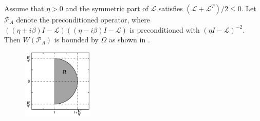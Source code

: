\documentclass[review]{siamart}
\begin{document}
%
\begin{theorem}\label{th:fov}
Assume that $\eta > 0$ and the symmetric part of $\mathcal{L}$ satisfies
$(\mathcal{L}+\mathcal{L}^T)/2 \leq 0$. Let $\mathcal{P}_A$ denote the preconditioned
operator, where $((\eta + i\beta)I - \mathcal{L})((\eta - i\beta)I - \mathcal{L})$ is
preconditioned with $(\eta I - \mathcal{L})^{-2}$. Then $W(\mathcal{P}_A)$ is bounded
by $\Omega$ as shown in .
\begin{figure}[h!]
\centering
\includegraphics[width = 0.3\textwidth]{fov.pdf}
\caption{}
\label{fig:bound}
\end{figure}
\end{theorem}
\end{document}
